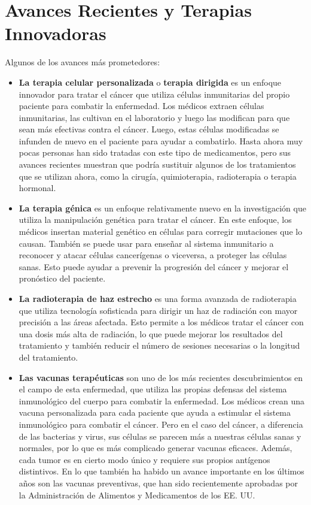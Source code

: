 \section{Avances Recientes y Terapias Innovadoras}

Algunos de los avances más prometedores:
\begin{itemize}
    \item \textbf{La terapia celular personalizada} o \textbf{terapia dirigida} es un enfoque innovador para tratar el cáncer que utiliza células inmunitarias del propio paciente para combatir la enfermedad. Los médicos extraen células inmunitarias, las cultivan en el laboratorio y luego las modifican para que sean más efectivas contra el cáncer. Luego, estas células modificadas se infunden de nuevo en el paciente para ayudar a combatirlo. Hasta ahora muy pocas personas han sido tratadas con este tipo de medicamentos, pero sus avances recientes muestran que podría sustituir algunos de los tratamientos que se utilizan ahora, como la cirugía, quimioterapia, radioterapia o terapia hormonal.
    \item \textbf{La terapia génica} es un enfoque relativamente nuevo en la investigación que utiliza la manipulación genética para tratar el cáncer. En este enfoque, los médicos insertan material genético en células para corregir mutaciones que lo causan. También se puede usar para enseñar al sistema inmunitario a reconocer y atacar células cancerígenas o viceversa, a proteger las células sanas. Esto puede ayudar a prevenir la progresión del cáncer y mejorar el pronóstico del paciente.
    \item \textbf{La radioterapia de haz estrecho} es una forma avanzada de radioterapia que utiliza tecnología sofisticada para dirigir un haz de radiación con mayor precisión a las áreas afectada. Esto permite a los médicos tratar el cáncer con una dosis más alta de radiación, lo que puede mejorar los resultados del tratamiento y también reducir el número de sesiones necesarias o la longitud del tratamiento.
    \item \textbf{Las vacunas terapéuticas} son uno de los más recientes descubrimientos en el campo de esta enfermedad, que utiliza las propias defensas del sistema inmunológico del cuerpo para combatir la enfermedad. Los médicos crean una vacuna personalizada para cada paciente que ayuda a estimular el sistema inmunológico para combatir el cáncer. Pero en el caso del cáncer, a diferencia de las bacterias y virus, sus células se parecen más a nuestras células sanas y normales, por lo que es más complicado generar vacunas eficaces. Además, cada tumor es en cierto modo único y requiere sus propios antígenos distintivos. En lo que también ha habido un avance importante en los últimos años son las vacunas preventivas, que han sido recientemente aprobadas por la Administración de Alimentos y Medicamentos de los EE. UU.
\end{itemize}

